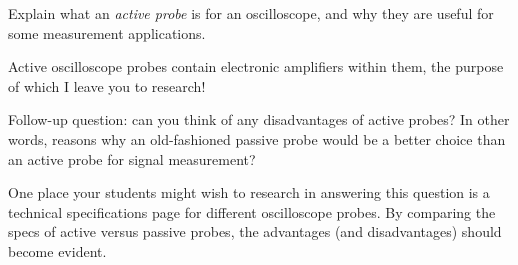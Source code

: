 

Explain what an {\it active probe} is for an oscilloscope, and why they are useful for some measurement applications.







Active oscilloscope probes contain electronic amplifiers within them, the purpose of which I leave you to research!

\vskip 10pt

Follow-up question: can you think of any disadvantages of active probes?  In other words, reasons why an old-fashioned passive probe would be a better choice than an active probe for signal measurement?







One place your students might wish to research in answering this question is a technical specifications page for different oscilloscope probes.  By comparing the specs of active versus passive probes, the advantages (and disadvantages) should become evident.




